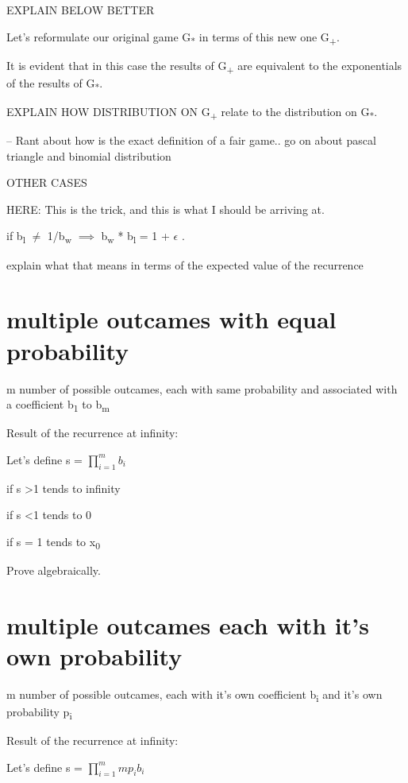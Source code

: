 \documentclass[12pt,reqno]{amsart}
\begin{document}
EXPLAIN BELOW BETTER

Let's reformulate our original game G\textsubscript{*} in terms of this new one G\textsubscript{+}.

It is evident that in this case the results of G\textsubscript{+} are equivalent to the exponentials of the results of G\textsubscript{*}.

EXPLAIN HOW DISTRIBUTION ON G\textsubscript{+} relate to the distribution on G\textsubscript{*}.

-- Rant about how is the exact definition of a fair game.. go on about pascal triangle and binomial distribution


OTHER CASES

HERE: This is the trick, and this is what I should be arriving at.

if b\textsubscript{l} $\neq$ 1/b\textsubscript{w}  $\implies$  b\textsubscript{w} * b\textsubscript{l} = 1 + $\epsilon$ .

explain what that means in terms of the expected value of the recurrence


\section{multiple outcames with equal probability}

m number of possible outcames, each with same probability and associated with a coefficient b\textsubscript{1} to b\textsubscript{m}



Result of the recurrence at infinity:



Let's define s = $\prod_{i=1}^{m} b_{i}$

if s \textgreater 1 tends to infinity

if s \textless 1 tends to 0

if s = 1 tends to x\textsubscript{0}


Prove algebraically.

\section{multiple outcames each with it's own probability}

m number of possible outcames, each with it's own coefficient b\textsubscript{i} and it's own probability p\textsubscript{i}

Result of the recurrence at infinity:

Let's define s = $\prod_{i=1}^{m} mp_{i}b_{i}$
\end{document}
